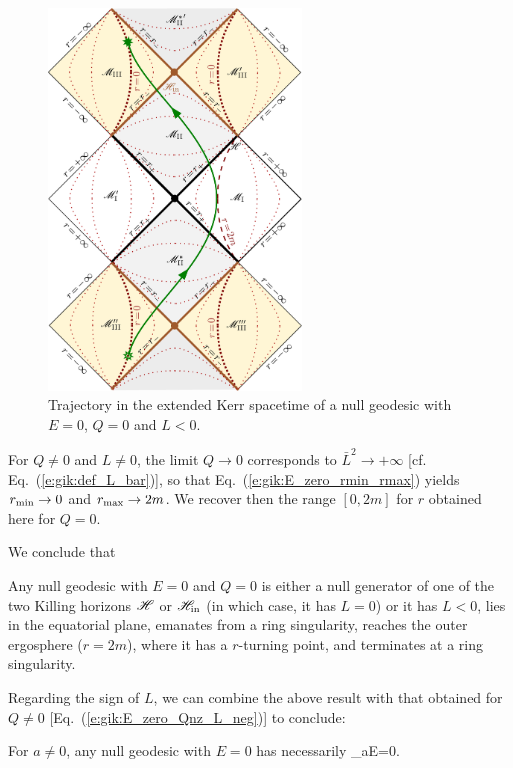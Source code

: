\begin{figure}
\centerline{\includegraphics[width=0.6\textwidth]{gik_zero_ener_traj_q0.pdf}}
\caption[]{\label{f:gik:zero_ener_traj_q0} \footnotesize
Trajectory in the extended Kerr spacetime of a null geodesic
with $E=0$, $Q=0$ and $L<0$.
}
\end{figure}


\begin{remark}
For $Q\neq 0$ and $L\neq 0$, the limit $Q\to 0$ corresponds to
$\bar{L}^2 \to +\infty$ [cf. Eq.~(\ref{e:gik:def_L_bar})], so that
Eq.~(\ref{e:gik:E_zero_rmin_rmax}) yields
$r_{\rm min}\to 0$ and $r_{\rm max}\to 2m$.
We recover then the range $[0, 2m]$ for $r$ obtained here for $Q=0$.
\end{remark}


We conclude that
\begin{greybox}
Any null geodesic with $E=0$ and $Q=0$
is either a null generator of one of the two Killing horizons
$\mathscr{H}$ or $\mathscr{H}_{\rm in}$ (in which case, it has $L=0$) or it has
$L < 0$, lies in the equatorial plane,
emanates from a ring singularity, reaches the outer ergosphere ($r=2m$),
where it has a $r$-turning point, and terminates at a ring singularity.
\end{greybox}

Regarding the sign of $L$, we can combine the above result with that
obtained for $Q\neq 0$ [Eq.~(\ref{e:gik:E_zero_Qnz_L_neg})] to conclude:
\begin{greybox}
For $a\neq 0$, any null geodesic with $E=0$ has necessarily
\be
    _{{a\atop E=0}}.
\ee
\end{greybox}



